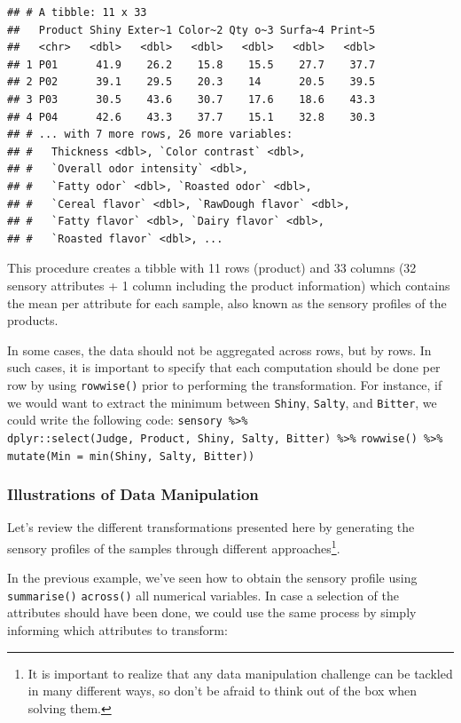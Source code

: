 \documentclass[
]{krantz}
\renewenvironment{quote}{\begin{VF}}{\end{VF}}
\begin{document}
\begin{verbatim}
## # A tibble: 11 x 33
##   Product Shiny Exter~1 Color~2 Qty o~3 Surfa~4 Print~5
##   <chr>   <dbl>   <dbl>   <dbl>   <dbl>   <dbl>   <dbl>
## 1 P01      41.9    26.2    15.8    15.5    27.7    37.7
## 2 P02      39.1    29.5    20.3    14      20.5    39.5
## 3 P03      30.5    43.6    30.7    17.6    18.6    43.3
## 4 P04      42.6    43.3    37.7    15.1    32.8    30.3
## # ... with 7 more rows, 26 more variables:
## #   Thickness <dbl>, `Color contrast` <dbl>,
## #   `Overall odor intensity` <dbl>,
## #   `Fatty odor` <dbl>, `Roasted odor` <dbl>,
## #   `Cereal flavor` <dbl>, `RawDough flavor` <dbl>,
## #   `Fatty flavor` <dbl>, `Dairy flavor` <dbl>,
## #   `Roasted flavor` <dbl>, ...
\end{verbatim}

This procedure creates a tibble with 11 rows (product) and 33 columns (32 sensory attributes + 1 column including the product information) which contains the mean per attribute for each sample, also known as the sensory profiles of the products.

\begin{quote}
In some cases, the data should not be aggregated across rows, but by rows. In such cases, it is important to specify that each computation should be done per row by using \texttt{rowwise()} prior to performing the transformation. For instance, if we would want to extract the minimum between \texttt{Shiny}, \texttt{Salty}, and \texttt{Bitter}, we could write the following code:
\texttt{sensory\ \%\textgreater{}\%}
\texttt{dplyr::select(Judge,\ Product,\ Shiny,\ Salty,\ Bitter)\ \%\textgreater{}\%}
\texttt{rowwise()\ \%\textgreater{}\%}
\texttt{mutate(Min\ =\ min(Shiny,\ Salty,\ Bitter))}
\end{quote}

\hypertarget{means}{%
\subsubsection*{Illustrations of Data Manipulation}\label{means}}


Let's review the different transformations presented here by generating the sensory profiles of the samples through different approaches\footnote{It is important to realize that any data manipulation challenge can be tackled in many different ways, so don't be afraid to think out of the box when solving them.}.

In the previous example, we've seen how to obtain the sensory profile using \texttt{summarise()} \texttt{across()} all numerical variables. In case a selection of the attributes should have been done, we could use the same process by simply informing which attributes to transform:
\end{document}
